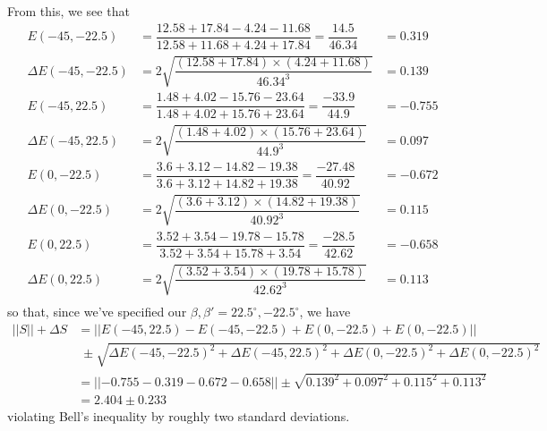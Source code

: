 \documentclass[10pt,a4paper]{article}
\begin{document}
\noindent From this, we see that
\begin{align*}
E(-45, -22.5) &= \dfrac{12.58 + 17.84 - 4.24 - 11.68}{12.58 + 11.68 + 4.24 + 17.84} = \dfrac{14.5}{46.34} &= 0.319\\
\Delta E(-45, -22.5) &= 2\sqrt{\dfrac{(12.58 + 17.84)\times(4.24 + 11.68)}{46.34^{3}}} &= 0.139\\
E(-45, 22.5) &= \dfrac{1.48 + 4.02 - 15.76 - 23.64}{1.48 + 4.02 + 15.76 + 23.64} = \dfrac{-33.9}{44.9} &= -0.755\\
\Delta E(-45, 22.5) &= 2\sqrt{\dfrac{(1.48 + 4.02)\times(15.76 + 23.64)}{44.9^{3}}} &= 0.097\\
E(0,-22.5) &= \dfrac{3.6 + 3.12 - 14.82 - 19.38}{3.6 + 3.12 + 14.82 + 19.38} = \dfrac{-27.48}{40.92} &= -0.672\\
\Delta E(0, -22.5) &= 2\sqrt{\dfrac{(3.6 + 3.12)\times(14.82 + 19.38)}{40.92^{3}}} &= 0.115\\
E(0,22.5) &= \dfrac{3.52 + 3.54 - 19.78 - 15.78}{3.52 + 3.54 + 15.78 + 3.54} = \dfrac{-28.5}{42.62} &= -0.658\\
\Delta E(0,22.5) &= 2\sqrt{\dfrac{(3.52 + 3.54)\times(19.78 + 15.78)}{42.62^{3}}} &= 0.113\\
\end{align*}
\noindent so that, since we've specified our $\beta,\beta' = 22.5^{\circ}, -22.5^{\circ}$, we have
\begin{align*}
\lvert| S \rvert| + \Delta S &= \lvert|E(-45, 22.5) - E(-45, -22.5) + E(0,-22.5) + E(0,-22.5)\rvert|\\
&\;\pm \sqrt{\Delta E(-45, -22.5)^{2} + \Delta E(-45, 22.5)^{2} + \Delta E(0,-22.5)^{2} + \Delta E(0,-22.5)^{2}}\\
&= \lvert|-0.755 - 0.319 - 0.672 - 0.658 \rvert| \pm \sqrt{0.139^{2} + 0.097^{2} + 0.115^{2} + 0.113^{2}}\\
&= 2.404 \pm 0.233
\end{align*}
\noindent violating Bell's inequality by roughly two standard deviations.
\end{document}
